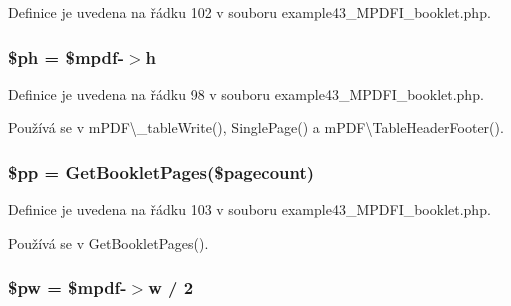 Definice je uvedena na řádku 102 v souboru example43\-\_\-\-M\-P\-D\-F\-I\-\_\-booklet.\-php.

\hypertarget{example43___m_p_d_f_i__booklet_8php_ac1d420fcdb8b362b7909b4f257c9b916}{
\subsubsection[{\$ph}]{\setlength{\rightskip}{0pt plus 5cm}\$ph = \$mpdf-\/$>$h}}\label{example43___m_p_d_f_i__booklet_8php_ac1d420fcdb8b362b7909b4f257c9b916}


Definice je uvedena na řádku 98 v souboru example43\-\_\-\-M\-P\-D\-F\-I\-\_\-booklet.\-php.



Používá se v m\-P\-D\-F\textbackslash{}\-\_\-table\-Write(), Single\-Page() a m\-P\-D\-F\textbackslash{}\-Table\-Header\-Footer().

\hypertarget{example43___m_p_d_f_i__booklet_8php_afdc7058c7adc87561bca9d538b13632e}{
\subsubsection[{\$pp}]{\setlength{\rightskip}{0pt plus 5cm}\$pp = {\bf Get\-Booklet\-Pages}(\$pagecount)}}\label{example43___m_p_d_f_i__booklet_8php_afdc7058c7adc87561bca9d538b13632e}


Definice je uvedena na řádku 103 v souboru example43\-\_\-\-M\-P\-D\-F\-I\-\_\-booklet.\-php.



Používá se v Get\-Booklet\-Pages().

\hypertarget{example43___m_p_d_f_i__booklet_8php_a4a84bb9d73addd9e90f2f34c36035df4}{
\subsubsection[{\$pw}]{\setlength{\rightskip}{0pt plus 5cm}\$pw = \$mpdf-\/$>$w / 2}}\label{example43___m_p_d_f_i__booklet_8php_a4a84bb9d73addd9e90f2f34c36035df4}


